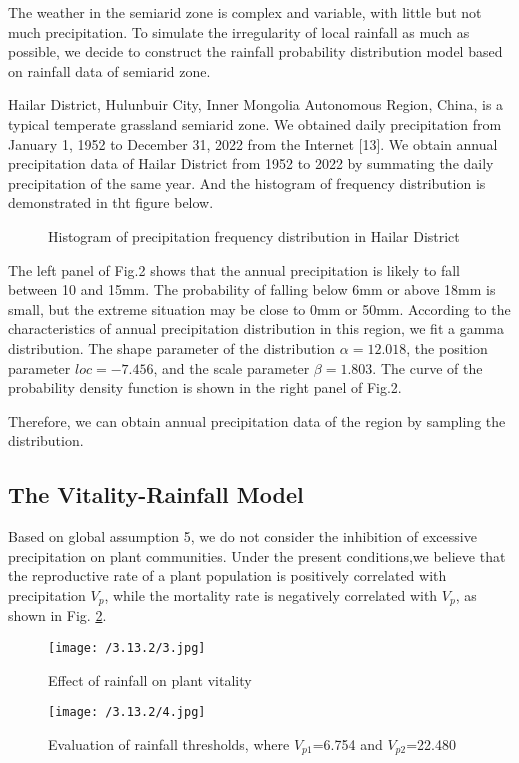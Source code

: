 \documentclass{mcmthesis}
\begin{document}
The weather in the semiarid zone is complex and variable, with little but not much precipitation. To simulate the irregularity of local rainfall as much as possible, we decide to construct the rainfall probability distribution model based on rainfall data of semiarid zone. 

Hailar District, Hulunbuir City, Inner Mongolia Autonomous Region, China, is a typical temperate grassland semiarid zone. We obtained daily precipitation from January 1, 1952 to December 31, 2022 from the Internet [13]. We obtain annual precipitation data of Hailar District from 1952 to 2022 by summating the daily precipitation of the same year. And the histogram of frequency distribution is demonstrated in tht figure below.

\begin{figure}[h]\label{histo1}
	\centering
	\caption{Histogram of precipitation frequency distribution in Hailar District} 
\end{figure}

The left panel of Fig.2 shows that the annual precipitation is likely to fall between 10 and 15mm. The probability of falling below 6mm or above 18mm is small, but the extreme situation may be  close to 0mm or  50mm. According to the characteristics of annual precipitation distribution in this region, we fit a gamma distribution. The shape parameter of the distribution  $\alpha=12.018$, the position parameter $loc=-7.456$, and the scale parameter $\beta=1.803$. The curve of the probability density function is shown in the right panel of Fig.2.

Therefore, we can obtain annual precipitation data of the region by sampling the distribution.

\subsection{The Vitality-Rainfall Model}

Based on global assumption 5, we do not consider the inhibition of excessive precipitation on plant communities. Under the present conditions,we believe that the reproductive rate of a plant population is positively correlated with precipitation $V_p$, while the mortality rate is negatively correlated with $V_p$, as shown in Fig. \ref{cartoon}.

\begin{figure}[h]
	\centering
	\texttt{[image: /3.13.2/3.jpg]}
	\caption{Effect of rainfall on plant vitality} 
	\label{cartoon}
\end{figure}
\begin{figure}[h]
	\centering
	\texttt{[image: /3.13.2/4.jpg]}
	\caption{Evaluation of rainfall thresholds,	where $V_{p1}$=6.754 and $V_{p2}$=22.480} 
	\label{density}
\end{figure}
\end{document}
